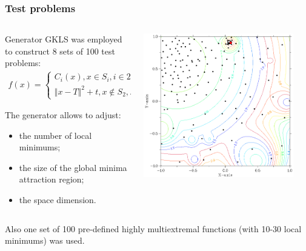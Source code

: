 \documentclass[aspectratio=1610]{beamer}
\begin{document}
\begin{frame}
  \frametitle{Test problems}
  \begin{columns}
    \begin{column}{0.5\textwidth}
      Generator GKLS was employed to construct 8 sets of 100 test problems:
      \begin{displaymath}
        \begin{matrix}
          f(x)=
          \left\{
          \begin{matrix}
          C_i(x), x \in S_i, i\in 2,\dots ,m \\
          \Vert x-T \Vert^2 + t, x\not\in S_2,\dots,S_m
          \end{matrix} \right.
        \end{matrix}
      \end{displaymath}

      The generator allows to adjust:
      \begin{itemize}
        \item the number of local minimums;
        \item the size of the global minima attraction region;
        \item the space dimension.
      \end{itemize}
    \end{column}
    \begin{column}{0.5\textwidth}
      \centerline{\includegraphics[width=0.9\textwidth]{gkls_color.png}}
    \end{column}
  \end{columns}
  Also one set of 100 pre-defined highly multiextremal functions (with 10-30 local minimums) was used.
\end{frame}
\end{document}
